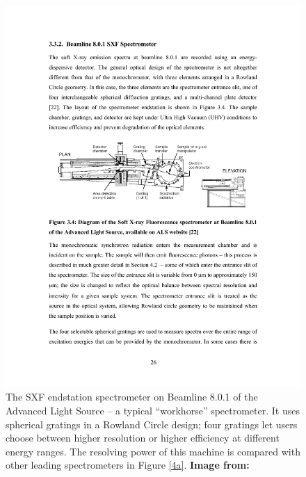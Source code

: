 \begin{figure}[htbp] %
   \centering
   \includegraphics[scale=1.2]{../data/Chapter1/1d_spectrometerExample/1d_bl801SXF_2.pdf} 
   \caption{The SXF endstation spectrometer on Beamline 8.0.1 of the Advanced Light Source -- a typical ``workhorse'' spectrometer.  It uses spherical gratings in a Rowland Circle design; four gratings let users choose between higher resolution or higher efficiency at different energy ranges.  The resolving power of this machine is compared with other leading spectrometers in Figure \ref{4a}.  \textbf{Image from:} \cite{Jia95}}
   \label{1d}
\end{figure}

